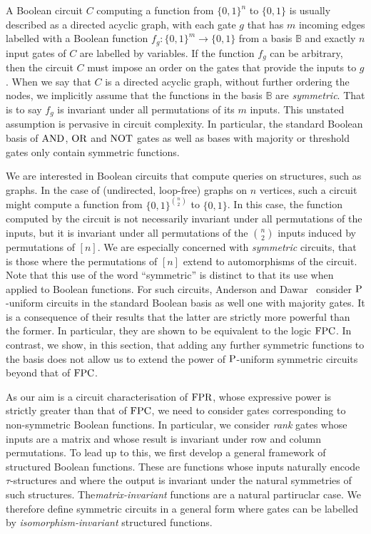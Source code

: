 \documentclass[../paper.tex]{subfiles}
\begin{document}


A Boolean circuit $C$ computing a function from $\{0,1\}^n$ to $\{0,1\}$ is
usually described as a directed acyclic graph, with each gate $g$ that has $m$
incoming edges labelled with a Boolean function $f_g : \{0,1\}^m \rightarrow
\{0,1\}$ from a basis $\mathbb{B}$ and exactly $n$ input gates of $C$ are
labelled by variables. If the function $f_g$ can be arbitrary, then the circuit
$C$ must impose an order on the gates that provide the inputs to $g$. When we
say that $C$ is a directed acyclic graph, without further ordering the nodes, we
implicitly assume that the functions in the basis $\mathbb{B}$ are
\emph{symmetric}. That is to say $f_g$ is invariant under all permutations of
its $m$ inputs. This unstated assumption is pervasive in circuit complexity. In
particular, the standard Boolean basis of $\text{\upshape AND}$, $\text{\upshape OR}$ and $\text{\upshape NOT}$ gates as well as bases
with majority or threshold gates only contain symmetric functions.

We are interested in Boolean circuits that compute queries on structures, such
as graphs. In the case of (undirected, loop-free) graphs on $n$ vertices, such a
circuit might compute a function from $\{0,1\}^{n \choose 2}$ to $\{0,1\}$. In
this case, the function computed by the circuit is not necessarily invariant
under all permutations of the inputs, but it is invariant under all permutations
of the $n \choose 2$ inputs induced by permutations of $[n]$. We are especially
concerned with \emph{symmetric} circuits, that is those where the permutations
of $[n]$ extend to automorphisms of the circuit. Note that this use of the word
``symmetric'' is distinct to that its use when applied to Boolean functions. For
such circuits, Anderson and Dawar~\cite{AndersonD17} consider $\mathrm{P}$-uniform
circuits in the standard Boolean basis as well one with majority gates. It is a
consequence of their results that the latter are strictly more powerful than the
former. In particular, they are shown to be equivalent to the logic $\text{\upshape FPC}$. In
contrast, we show, in this section, that adding any further symmetric functions
to the basis does not allow us to extend the power of $\mathrm{P}$-uniform symmetric
circuits beyond that of $\text{\upshape FPC}$.

As our aim is a circuit characterisation of $\text{\upshape FPR}$, whose expressive power is
strictly greater than that of $\text{\upshape FPC}$, we need to consider gates corresponding to
non-symmetric Boolean functions. In particular, we consider \emph{rank} gates
whose inputs are a matrix and whose result is invariant under row and column
permutations. To lead up to this, we first develop a general framework of
structured Boolean functions. These are functions whose inputs naturally encode
$\tau$-structures and where the output is invariant under the natural symmetries
of such structures. The\emph{matrix-invariant} functions are a natural
partiruclar case. We therefore define symmetric circuits in a general form where
gates can be labelled by \emph{isomorphism-invariant} structured functions.
\end{document}
